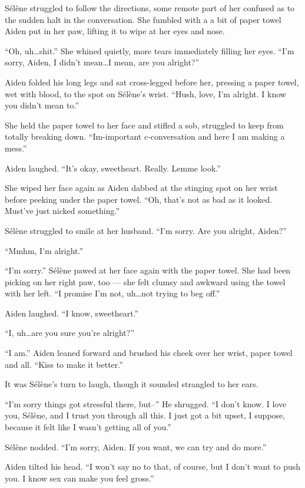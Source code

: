 Sélène struggled to follow the directions, some remote part of her confused as to the sudden halt in the conversation. She fumbled with a a bit of paper towel Aiden put in her paw, lifting it to wipe at her eyes and nose.

``Oh, uh\ldots{}shit.'' She whined quietly, more tears immediately filling her eyes. ``I'm sorry, Aiden, I didn't mean\ldots{}I mean, are you alright?''

Aiden folded his long legs and sat cross-legged before her, pressing a paper towel, wet with blood, to the spot on Sélène's wrist. ``Hush, love, I'm alright. I know you didn't mean to.''

She held the paper towel to her face and stifled a sob, struggled to keep from totally breaking down. ``Im-important c-conversation and here I am making a mess.''

Aiden laughed. ``It's okay, sweetheart. Really. Lemme look.''

She wiped her face again as Aiden dabbed at the stinging spot on her wrist before peeking under the paper towel. ``Oh, that's not as bad as it looked. Must've just nicked something.''

Sélène struggled to smile at her husband. ``I'm sorry. Are you alright, Aiden?''

``Mmhm, I'm alright.''

``I'm sorry.'' Sélène pawed at her face again with the paper towel. She had been picking on her right paw, too --- she felt clumsy and awkward using the towel with her left. ``I promise I'm not, uh\ldots{}not trying to beg off.''

Aiden laughed. ``I know, sweetheart.''

``I, uh\ldots{}are you sure you're alright?''

``I am.'' Aiden leaned forward and brushed his cheek over her wrist, paper towel and all. ``Kiss to make it better.''

It was Sélène's turn to laugh, though it sounded strangled to her ears.

``I'm sorry things got stressful there, but--'' He shrugged. ``I don't know. I love you, Sélène, and I trust you through all this. I just got a bit upset, I suppose, because it felt like I wasn't getting all of you.''

Sélène nodded. ``I'm sorry, Aiden. If you want, we can try and do more.''

Aiden tilted his head. ``I won't say no to that, of course, but I don't want to push you. I know sex can make you feel gross.''

